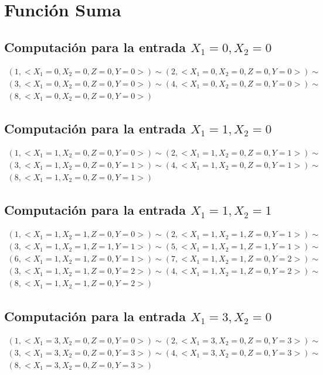 \documentclass[a4paper]{article}
\begin{document}
		\section{Función Suma}
		\subsection{Computación para la entrada $X_1=0, X_2=0$}
		\begin{equation*}\begin{gathered}
		(1, <X_1=0, X_2=0, Z=0, Y=0>) \sim (2, <X_1=0, X_2=0, Z=0, Y=0>) \sim\\
		(3, <X_1=0, X_2=0, Z=0, Y=0>) \sim (4, <X_1=0, X_2=0, Z=0, Y=0>) \sim\\
		(8, <X_1=0, X_2=0, Z=0, Y=0>)
		\end{gathered}\end{equation*}
		\subsection{Computación para la entrada $X_1=1, X_2=0$}
		\begin{equation*}\begin{gathered}
		(1, <X_1=1, X_2=0, Z=0, Y=0>) \sim (2, <X_1=1, X_2=0, Z=0, Y=1>) \sim\\
		(3, <X_1=1, X_2=0, Z=0, Y=1>) \sim (4, <X_1=1, X_2=0, Z=0, Y=1>) \sim\\
		(8, <X_1=1, X_2=0, Z=0, Y=1>)
		\end{gathered}\end{equation*}
		\subsection{Computación para la entrada $X_1=1, X_2=1$}
		\begin{equation*}\begin{gathered}
		(1, <X_1=1, X_2=1, Z=0, Y=0>) \sim (2, <X_1=1, X_2=1, Z=0, Y=1>) \sim\\
		(3, <X_1=1, X_2=1, Z=1, Y=1>) \sim (5, <X_1=1, X_2=1, Z=1, Y=1>) \sim\\
		(6, <X_1=1, X_2=1, Z=0, Y=1>) \sim (7, <X_1=1, X_2=1, Z=0, Y=2>) \sim\\
		(3, <X_1=1, X_2=1, Z=0, Y=2>) \sim (4, <X_1=1, X_2=1, Z=0, Y=2>) \sim\\
		(8, <X_1=1, X_2=1, Z=0, Y=2>)
		\end{gathered}\end{equation*}
		\subsection{Computación para la entrada $X_1=3, X_2=0$}
		\begin{equation*}\begin{gathered}
		(1, <X_1=3, X_2=0, Z=0, Y=0>) \sim (2, <X_1=3, X_2=0, Z=0, Y=3>) \sim\\
		(3, <X_1=3, X_2=0, Z=0, Y=3>) \sim (4, <X_1=3, X_2=0, Z=0, Y=3>) \sim\\
		(8, <X_1=3, X_2=0, Z=0, Y=3>)
		\end{gathered}\end{equation*}
\end{document}
